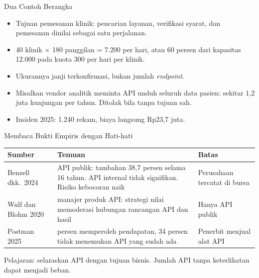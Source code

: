 \documentclass[aspectratio=169, table, 12pt]{beamer}
\begin{document}
\begin{frame}{{\Large Dua Contoh Berangka}}
  \vspace{8pt}
  \begin{itemize}
    \item Tujuan pemesanan klinik: pencarian layanan, verifikasi syarat, dan pemesanan dinilai sebagai satu perjalanan.
    \item 40 klinik $\times$ 180 panggilan = 7.200 per hari, atau 60 persen dari kapasitas 12.000 pada kuota 300 per hari per klinik.
    \item Ukurannya janji terkonfirmasi, bukan jumlah \textit{endpoint}.
    \item Misalkan vendor analitik meminta API unduh seluruh data pasien: sekitar 1,2 juta kunjungan per tahun. Ditolak bila tanpa tujuan sah.
    \item Insiden 2025: 1.240 rekam, biaya langsung Rp23,7 juta.
  \end{itemize}
\end{frame}

\begin{frame}{{\Large Membaca Bukti Empiris dengan Hati-hati}}
  \footnotesize
  \begin{tabularx}{\textwidth}{>{\raggedright\arraybackslash}p{2.8cm} >{\raggedright\arraybackslash}X >{\raggedright\arraybackslash}p{4.1cm}}
    \hline
    \textbf{Sumber} & \textbf{Temuan} & \textbf{Batas} \\ \hline
    Benzell dkk.\ 2024 & API publik: tambahan 38,7 persen selama 16 tahun. API internal tidak signifikan. Risiko kebocoran naik & Perusahaan tercatat di bursa \\ \hline
    Wulf dan Blohm 2020 & 152 manajer produk API: strategi nilai memoderasi hubungan rancangan API dan hasil & Hanya API publik \\ \hline
    Postman 2025 & 65 persen memperoleh pendapatan, 34 persen tidak menemukan API yang sudah ada & Penerbit menjual alat API \\ \hline
  \end{tabularx}

  \vspace{8pt}
  \small Pelajaran: selaraskan API dengan tujuan bisnis. Jumlah API tanpa keterlihatan dapat menjadi beban.
\end{frame}
\end{document}
